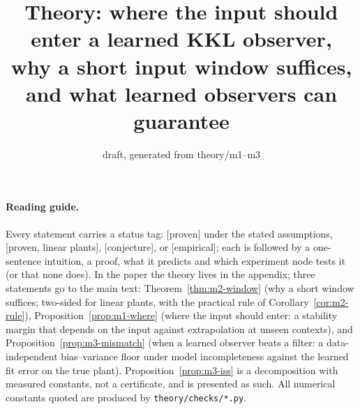 \documentclass[11pt]{article}
\title{Theory: where the input should enter a learned KKL observer,\\ why a short input window suffices, and what learned observers can guarantee}
\date{draft, generated from theory/m1--m3}
\theoremstyle{definition}
\begin{document}
\maketitle
\paragraph{Reading guide.} Every statement carries a status tag: [proven] under the stated assumptions, [proven, linear
plants], [conjecture], or [empirical]; each is followed by a one-sentence intuition, a proof, what it predicts and which
experiment node tests it (or that none does). In the paper the theory lives in the appendix; three statements go to the
main text: Theorem~\ref{thm:m2-window} (why a short window suffices; two-sided for linear plants, with the practical rule
of Corollary~\ref{cor:m2-rule}), Proposition~\ref{prop:m1-where} (where the input should enter: a stability margin that
depends on the input against extrapolation at unseen contexts), and Proposition~\ref{prop:m3-mismatch} (when a learned
observer beats a filter: a data-independent bias--variance floor under model incompleteness against the learned fit error
on the true plant). Proposition~\ref{prop:m3-iss} is a decomposition with measured constants, not a certificate, and is
presented as such. All numerical constants quoted are produced by \texttt{theory/checks/*.py}.





\end{document}
